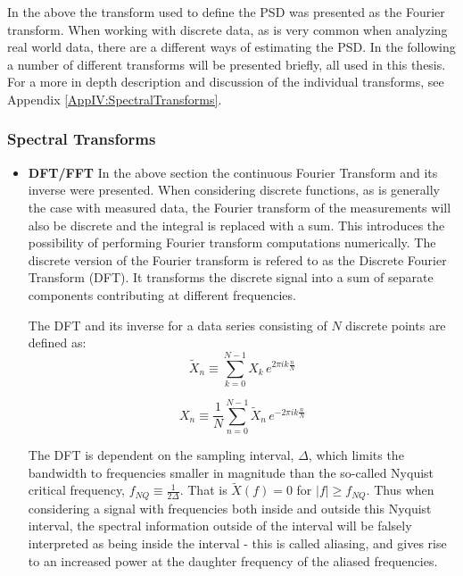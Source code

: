 \documentclass[../../CompleteThesis2/Complete_2ndDraft]{subfiles}
\begin{document}
In the above the transform used to define the PSD was presented as the Fourier transform. When working with discrete data, as is very common when analyzing real world data, there are a different ways of estimating the PSD. In the following a number of different transforms will be presented briefly, all used in this thesis. For a more in depth description and discussion of the individual transforms, see Appendix \ref{AppIV:SpectralTransforms}.


\subsubsection[Spectral Transforms][Spectral Transforms]{Spectral Transforms}
\label{Subsubsec:SignalAnalysis_BackDiffusion_SpectralAnalysis_SpectralTransforms}

\begin{itemize}
	\item \textbf{DFT/FFT} In the above section the continuous Fourier Transform and its inverse were presented. When considering discrete functions, as is generally the case with measured data, the Fourier transform of the measurements will also be discrete and the integral is replaced with a sum. This introduces the possibility of performing Fourier transform computations numerically. The discrete version of the Fourier transform is refered to as the Discrete Fourier Transform (DFT). It transforms the discrete signal into a sum of separate components contributing at different frequencies.
	
	The DFT and its inverse for a data series consisting of $N$ discrete points are defined as:
	\begin{equation}
		\tilde{X}_n\equiv \sum_{k=0}^{N-1}X_k \, e^{2\pi i k \frac{n}{N}}
	\end{equation}

	\begin{equation}
		X_n\equiv \frac{1}{N} \sum_{n=0}^{N-1}\tilde{X}_n \, e^{-2\pi i k \frac{n}{N}}
	\end{equation}

	The DFT is dependent on the sampling interval, $\Delta$, which limits the bandwidth to frequencies smaller in magnitude than the so-called Nyquist critical frequency, $f_{NQ}\equiv\frac{1}{2\Delta}$. That is $\tilde{X}(f)=0$ for $|f|\geq f_{NQ}$. Thus when considering a signal with frequencies both inside and outside this Nyquist interval, the spectral information outside of the interval will be falsely interpreted as being inside the interval - this is called aliasing, and gives rise to an increased power at the daughter frequency of the aliased frequencies.
	

\end{itemize}
\end{document}
